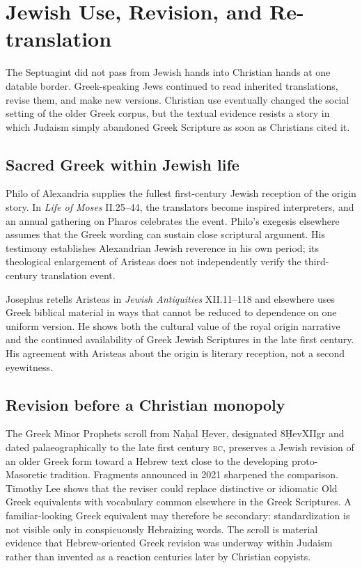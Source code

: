 \section{Jewish Use, Revision, and Re-translation}

The Septuagint did not pass from Jewish hands into Christian hands at one datable border. Greek-speaking Jews continued to read inherited translations, revise them, and make new versions. Christian use eventually changed the social setting of the older Greek corpus, but the textual evidence resists a story in which Judaism simply abandoned Greek Scripture as soon as Christians cited it.

\subsection{Sacred Greek within Jewish life}

Philo of Alexandria supplies the fullest first-century Jewish reception of the origin story. In \emph{Life of Moses} II.25--44, the translators become inspired interpreters, and an annual gathering on Pharos celebrates the event. Philo's exegesis elsewhere assumes that the Greek wording can sustain close scriptural argument. His testimony establishes Alexandrian Jewish reverence in his own period; its theological enlargement of Aristeas does not independently verify the third-century translation event.

Josephus retells Aristeas in \emph{Jewish Antiquities} XII.11--118 and elsewhere uses Greek biblical material in ways that cannot be reduced to dependence on one uniform version. He shows both the cultural value of the royal origin narrative and the continued availability of Greek Jewish Scriptures in the late first century. His agreement with Aristeas about the origin is literary reception, not a second eyewitness.

\subsection{Revision before a Christian monopoly}

The Greek Minor Prophets scroll from Na\d{h}al \d{H}ever, designated 8\d{H}evXIIgr and dated palaeographically to the late first century \textsc{bc}, preserves a Jewish revision of an older Greek form toward a Hebrew text close to the developing proto-Masoretic tradition. Fragments announced in 2021 sharpened the comparison. Timothy Lee shows that the reviser could replace distinctive or idiomatic Old Greek equivalents with vocabulary common elsewhere in the Greek Scriptures. A familiar-looking Greek equivalent may therefore be secondary: standardization is not visible only in conspicuously Hebraizing words. The scroll is material evidence that Hebrew-oriented Greek revision was underway within Judaism rather than invented as a reaction centuries later by Christian copyists.

